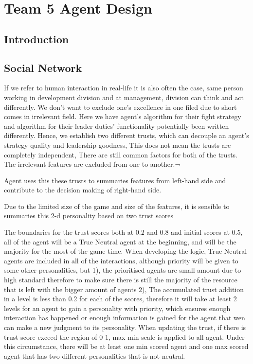  \useunder{\uline}{\ul}{}
\chapter{Team 5 Agent Design}\label{team_6_agent_design}
\section{Introduction}


\section{Social Network}
If we refer to human interaction in real-life it is also often the case, same person working in development division and at management, division can think and act differently. 
We don’t want to exclude one’s excellence in one filed due to short comes in irrelevant field.
Here we have agent’s algorithm for their fight strategy and algorithm for their leader duties’ functionality potentially been written differently. 
Hence, we establish two different trusts, which can decouple an agent’s strategy quality and leadership goodness, 
This does not mean the trusts are completely independent, 
There are still common factors for both of the trusts.
The irrelevant features are excluded from one to another.¬

Agent uses this these trusts to summaries features from left-hand side and contribute to the decision making of right-hand side. 

Due to the limited size of the game and size of the features, it is sensible to summaries this 2-d personality based on two trust scores

The boundaries for the trust scores both at 0.2 and 0.8 and initial scores at 0.5, all of the agent will be a True Neutral agent at the beginning, and will be the majority for the most of the game time. When developing the logic, True Neutral agents are included in all of the interactions, although priority will be given to some other personalities, but 1), the prioritised agents are small amount due to high standard therefore to make sure there is still the majority of the resource that is left with the bigger amount of agents 2), The accumulated trust addition in a level is less than 0.2 for each of the scores, therefore it will take at least 2 levels for an agent to gain a personality with priority, which ensures enough interaction has happened or enough information is gained for the agent that wen can make a new judgment to its personality. When updating the trust, if there is trust score exceed the region of 0-1, max-min scale is applied to all agent. Under this circumstance, there will be at least one min scored agent and one max scored agent that has two different personalities that is not neutral. 

